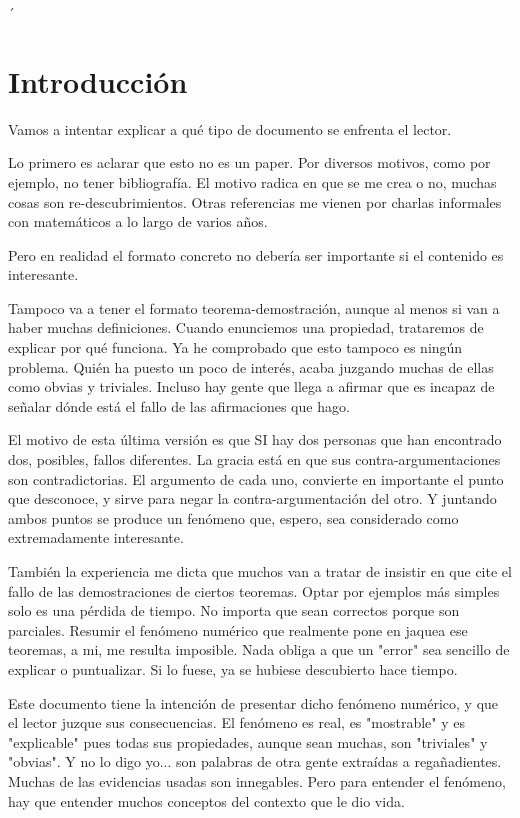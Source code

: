´\chapter{Introducción}

Vamos a intentar explicar a qué tipo de documento se enfrenta el lector.

Lo primero es aclarar que esto no es un paper. Por diversos motivos, como por ejemplo, no tener bibliografía. El motivo radica en que se me crea o no, muchas cosas son re-descubrimientos. Otras referencias me vienen por charlas informales con matemáticos a lo largo de varios años.

Pero en realidad el formato concreto no debería ser importante si el contenido es interesante.

Tampoco va a tener el formato teorema-demostración, aunque al menos si van a haber muchas definiciones. Cuando enunciemos una propiedad, trataremos de explicar por qué funciona. Ya he comprobado que esto tampoco es ningún problema. Quién ha puesto un poco de interés, acaba juzgando muchas de ellas como obvias y triviales. Incluso hay gente que llega a afirmar que es incapaz de señalar dónde está el fallo de las afirmaciones que hago.

El motivo de esta última versión es que SI hay dos personas que han encontrado dos, posibles, fallos diferentes. La gracia está en que sus contra-argumentaciones son contradictorias. El argumento de cada uno, convierte en importante el punto que desconoce, y sirve para negar la contra-argumentación del otro. Y juntando ambos puntos se produce un fenómeno que, espero, sea considerado como extremadamente interesante.

También la experiencia me dicta que muchos van a tratar de insistir en que cite el fallo de las demostraciones de ciertos teoremas. Optar por ejemplos más simples solo es una pérdida de tiempo. No importa que sean correctos porque son parciales. Resumir el fenómeno numérico que realmente pone en jaquea ese teoremas, a mi, me resulta imposible. Nada obliga a que un "error" sea sencillo de explicar o puntualizar. Si lo fuese, ya se hubiese descubierto hace tiempo.

Este documento tiene la intención de presentar dicho fenómeno numérico, y que el lector juzque sus consecuencias. El fenómeno es real, es "mostrable" y es "explicable" pues todas sus propiedades, aunque sean muchas, son "triviales" y "obvias". Y no lo digo yo... son palabras de otra gente extraídas a regañadientes. Muchas de las evidencias usadas son innegables. Pero para entender el fenómeno, hay que entender muchos conceptos del contexto que le dio vida.

